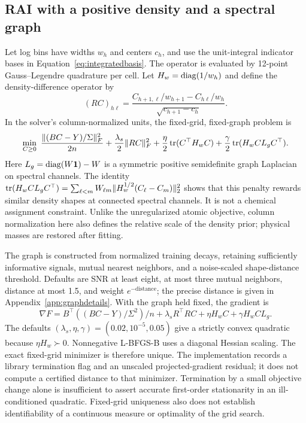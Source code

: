 \subsection{RAI with a positive density and a spectral graph}\label{sec:raidensity}
Let log bins have widths $w_h$ and centers $c_h$, and use the unit-integral indicator bases in Equation~\eqref{eq:integratedbasis}. The operator is evaluated by 12-point Gauss--Legendre quadrature per cell. Let $H_w=\operatorname{diag}(1/w_h)$ and define the density-difference operator by
\begin{equation}\label{eq:rairough}
 (RC)_{h\ell}=\frac{C_{h+1,\ell}/w_{h+1}-C_{h\ell}/w_h}
 {\sqrt{c_{h+1}-c_h}}.
\end{equation}
In the solver's column-normalized units, the fixed-grid, fixed-graph problem is
\begin{equation}\label{eq:raidensity}
 \min_{C\geq0}\ \frac{\|(BC-Y)/\Sigma\|_F^2}{2n}
 +\frac{\lambda_s}{2}\|RC\|_F^2
 +\frac{\eta}{2}\operatorname{tr}(C^\top H_wC)
 +\frac{\gamma}{2}\operatorname{tr}(H_w C L_g C^\top).
\end{equation}
Here $L_g=\operatorname{diag}(W\mathbf{1})-W$ is a symmetric positive semidefinite graph Laplacian on spectral channels. The identity $\operatorname{tr}(H_w C L_g C^\top)=\sum_{\ell<m}W_{\ell m}\|H_w^{1/2}(C_\ell-C_m)\|_2^2$ shows that this penalty rewards similar density shapes at connected spectral channels. It is not a chemical assignment constraint. Unlike the unregularized atomic objective, column normalization here also defines the relative scale of the density prior; physical masses are restored after fitting.

The graph is constructed from normalized training decays, retaining sufficiently informative signals, mutual nearest neighbors, and a noise-scaled shape-distance threshold. Defaults are SNR at least eight, at most three mutual neighbors, distance at most 1.5, and weight $e^{-\mathrm{distance}}$; the precise distance is given in Appendix~\ref{app:graphdetails}. With the graph held fixed, the gradient is
\begin{equation}\label{eq:raidensitygrad}
 \nabla F=B^\top((BC-Y)/\Sigma^2)/n
       +\lambda_sR^\top RC+\eta H_wC+\gamma H_w C L_g.
\end{equation}
The defaults $(\lambda_s,\eta,\gamma)=(0.02,10^{-5},0.05)$ give a strictly convex quadratic because $\eta H_w\succ0$. Nonnegative L-BFGS-B uses a diagonal Hessian scaling. The exact fixed-grid minimizer is therefore unique. The implementation records a library termination flag and an unscaled projected-gradient residual; it does not compute a certified distance to that minimizer. Termination by a small objective change alone is insufficient to assert accurate first-order stationarity in an ill-conditioned quadratic. Fixed-grid uniqueness also does not establish identifiability of a continuous measure or optimality of the grid search.

